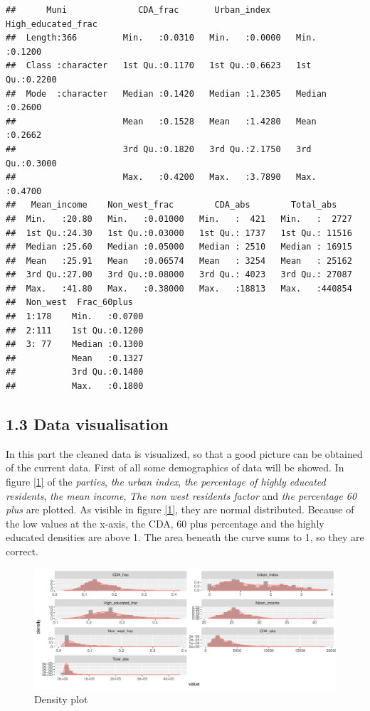 \documentclass[11pt,]{article}
\begin{document}
\begin{verbatim}
##      Muni              CDA_frac       Urban_index     High_educated_frac
##  Length:366         Min.   :0.0310   Min.   :0.0000   Min.   :0.1200    
##  Class :character   1st Qu.:0.1170   1st Qu.:0.6623   1st Qu.:0.2200    
##  Mode  :character   Median :0.1420   Median :1.2305   Median :0.2600    
##                     Mean   :0.1528   Mean   :1.4280   Mean   :0.2662    
##                     3rd Qu.:0.1820   3rd Qu.:2.1750   3rd Qu.:0.3000    
##                     Max.   :0.4200   Max.   :3.7890   Max.   :0.4700    
##   Mean_income    Non_west_frac        CDA_abs        Total_abs     
##  Min.   :20.80   Min.   :0.01000   Min.   :  421   Min.   :  2727  
##  1st Qu.:24.30   1st Qu.:0.03000   1st Qu.: 1737   1st Qu.: 11516  
##  Median :25.60   Median :0.05000   Median : 2510   Median : 16915  
##  Mean   :25.91   Mean   :0.06574   Mean   : 3254   Mean   : 25162  
##  3rd Qu.:27.00   3rd Qu.:0.08000   3rd Qu.: 4023   3rd Qu.: 27087  
##  Max.   :41.80   Max.   :0.38000   Max.   :18813   Max.   :440854  
##  Non_west  Frac_60plus    
##  1:178    Min.   :0.0700  
##  2:111    1st Qu.:0.1200  
##  3: 77    Median :0.1300  
##           Mean   :0.1327  
##           3rd Qu.:0.1400  
##           Max.   :0.1800
\end{verbatim}

\subsection{1.3 Data visualisation}\label{data-visualisation}

In this part the cleaned data is visualized, so that a good picture can
be obtained of the current data. First of all some demographics of data
will be showed. In figure \ref{1} of the \emph{parties}, \emph{the urban
index}, \emph{the percentage of highly educated residents}, \emph{the
mean income}, \emph{The non west residents factor} and \emph{the
percentage 60 plus} are plotted. As visible in figure \ref{1}, they are
normal distributed. Because of the low values at the x-axis, the CDA, 60
plus percentage and the highly educated densities are above 1. The area
beneath the curve sums to 1, so they are correct.

\begin{figure}[H]

{\centering \includegraphics{Report_files/figure-latex/demographics_data-1} 

}

\caption{\label{1} Density plot}\label{fig:demographics_data}
\end{figure}
\end{document}
